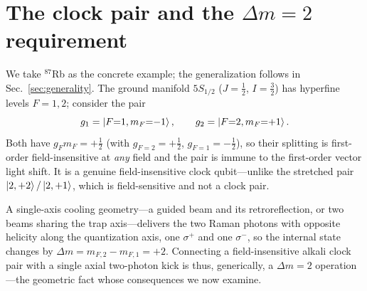 \documentclass[aps,pra,reprint,amsmath,amssymb,superscriptaddress,floatfix]{revtex4-2}
\newcommand{\Dm}{\Delta m}
\begin{document}
\section{The clock pair and the $\Dm=2$ requirement}\label{sec:clockpair}
We take $^{87}$Rb as the concrete example; the generalization follows in
Sec.~\ref{sec:generality}. The ground manifold $5S_{1/2}$ ($J=\tfrac12$, $I=\tfrac32$) has
hyperfine levels $F=1,2$; consider the pair
\begin{equation}
g_1=\ket{F{=}1,m_F{=}{-}1},\qquad g_2=\ket{F{=}2,m_F{=}{+}1}.
\end{equation}
Both have $g_F m_F=+\tfrac12$ (with $g_{F=2}=+\tfrac12$, $g_{F=1}=-\tfrac12$), so their splitting
is first-order field-insensitive at \emph{any} field and the pair is immune to the first-order
vector light shift. It is a genuine field-insensitive clock qubit---unlike the stretched pair
$\ket{2,+2}/\ket{2,+1}$, which is field-sensitive and not a clock pair.

A single-axis cooling geometry---a guided beam and its retroreflection, or two beams sharing the
trap axis---delivers the two Raman photons with opposite helicity along the quantization axis, one
$\sigma^+$ and one $\sigma^-$, so the internal state changes by $\Dm=m_{F,2}-m_{F,1}=+2$.
Connecting a field-insensitive alkali clock pair with a single axial two-photon kick is thus,
generically, a $\Dm=2$ operation---the geometric fact whose consequences we now examine.

\end{document}
